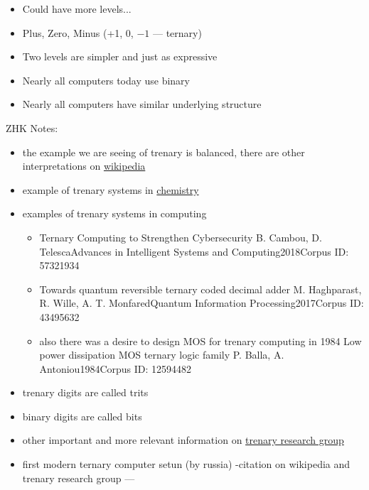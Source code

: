 \begin{frame}[fragile]
\begin{itemize}
	\item Could have more levels...


	\item	Plus, Zero, Minus (+1, 0, $-1$ --- ternary)
	\item   Two levels are simpler and just as expressive
	\item Nearly all computers today use binary
	\item Nearly all computers have similar underlying structure
\end{itemize}
\end{frame}
\BNotes\ifnum{}
ZHK Notes:
\begin{itemize}
\item the example we are seeing of trenary is balanced, there are other interpretations on  \href{https://en.wikipedia.org/wiki/Ternary_computer#:~:text=A%20ternary%20computer%2C%20also%20called,trits%2C%20instead%20of%20binary%20bits.}{wikipedia}
	\item example of trenary systems in  \href{https://eng.libretexts.org/Bookshelves/Chemical_Engineering/Phase_Relations_in_Reservoir_Engineering_(Adewumi)/05%3A_Phase_Diagrams_IV/5.04%3A_Ternary_Systems}{chemistry}
 \item examples of trenary systems in computing
 \begin{itemize}
     \item Ternary Computing to Strengthen Cybersecurity
B. Cambou, D. TelescaAdvances in Intelligent Systems and Computing2018Corpus ID: 57321934
\item Towards quantum reversible ternary coded decimal adder
M. Haghparast, R. Wille, A. T. MonfaredQuantum Information Processing2017Corpus ID: 43495632
\item also there was a desire to design MOS for trenary computing in 1984
Low power dissipation MOS ternary logic family
P. Balla, A. Antoniou1984Corpus ID: 12594482
 \end{itemize}
 \item trenary digits are called trits
 \item binary digits are called bits
 \item other important and more relevant information on \href{https://ternaryresearch.com/}{trenary research group}
 \item first modern ternary computer setun (by russia) -citation on wikipedia and trenary research group ---   
\end{itemize}
\fi\ENotes


